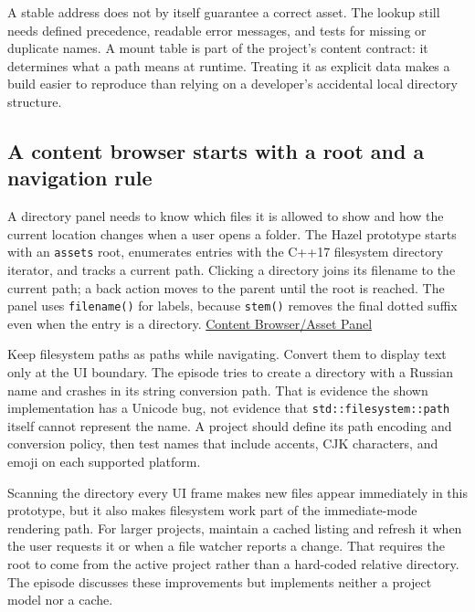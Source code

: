 A stable address does not by itself guarantee a correct asset. The lookup still needs defined precedence, readable error messages, and tests for missing or duplicate names. A mount table is part of the project's content contract: it determines what a path means at runtime. Treating it as explicit data makes a build easier to reproduce than relying on a developer's accidental local directory structure.

\subsection{A content browser starts with a root and a navigation rule}\label{06-engine-ii-ch027-a-content-browser-starts-with-a-root-and-a-navigation-rule}

\hypertarget{06-engine-ii-ch027-a-content-browser-starts-with-a-root-and-a-navigation-rule}{}

A directory panel needs to know which files it is allowed to show and how the current location changes when a user opens a folder. The Hazel prototype starts with an \texttt{assets} root, enumerates entries with the C++17 filesystem directory iterator, and tracks a current path. Clicking a directory joins its filename to the current path; a back action moves to the parent until the root is reached. The panel uses \texttt{filename()} for labels, because \texttt{stem()} removes the final dotted suffix even when the entry is a directory. \href{https://www.youtube.com/watch?v=aBuPmOGC7hU}{Content Browser/Asset Panel}

Keep filesystem paths as paths while navigating. Convert them to display text only at the UI boundary. The episode tries to create a directory with a Russian name and crashes in its string conversion path. That is evidence the shown implementation has a Unicode bug, not evidence that \texttt{std::filesystem::path} itself cannot represent the name. A project should define its path encoding and conversion policy, then test names that include accents, CJK characters, and emoji on each supported platform.

Scanning the directory every UI frame makes new files appear immediately in this prototype, but it also makes filesystem work part of the immediate-mode rendering path. For larger projects, maintain a cached listing and refresh it when the user requests it or when a file watcher reports a change. That requires the root to come from the active project rather than a hard-coded relative directory. The episode discusses these improvements but implements neither a project model nor a cache.

